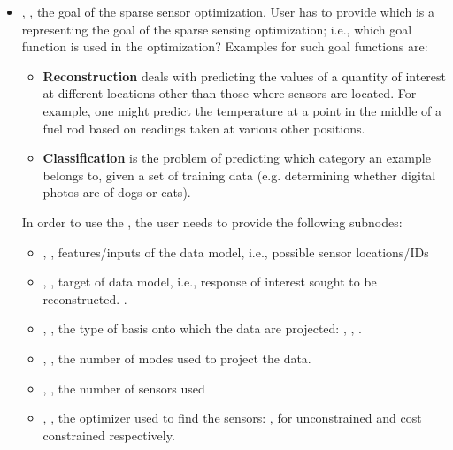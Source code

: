 \begin{itemize}
\item {}, , the goal of the sparse sensor optimization.
User has to provide  which is a  representing the goal of the sparse sensing optimization; i.e., which goal function is used in the optimization? Examples for such goal functions are:
\begin{itemize}
    \item \textbf{Reconstruction} deals with predicting the values of a quantity of interest at different locations other than those where sensors are located. For example, one might predict the temperature at a point in the middle of a fuel rod based on readings taken at various other positions.

    \item \textbf{Classification} is the problem of predicting which category an example belongs to, given a set of training data (e.g. determining whether digital photos are of dogs or cats).
\end{itemize}
In order to use the , the user needs to provide the following subnodes:
\begin{itemize}
	\item {}, , features/inputs of the data model, i.e., possible sensor locations/IDs
	\item {}, , target of data model, i.e., response of interest sought to be reconstructed.
  .
	\item {} , , the type of basis onto which the data are projected: , , . 
	\item {},  , the number of modes  used to project the data.
	\item {},  , the number of sensors used
	\item {},  , the optimizer used to find the sensors: ,  for unconstrained and cost constrained respectively.
\end{itemize}
\end{itemize}

